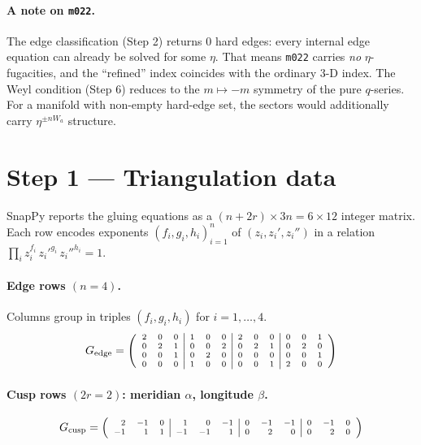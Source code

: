 \documentclass[11pt,a4paper]{article}
\begin{document}
\paragraph{A note on \texttt{m022}.}
The edge classification (Step 2) returns \(0\) hard edges: every
internal edge equation can already be solved for some \(\eta\).  That
means \texttt{m022} carries \emph{no} \(\eta\)-fugacities, and the
``refined'' index coincides with the ordinary \(3\)-D index.  The
Weyl condition (Step 6) reduces to the \(m\mapsto-m\) symmetry of the
pure \(q\)-series.  For a manifold with non-empty hard-edge set, the
sectors would additionally carry \(\eta^{\pm nW_a}\) structure.

\section{Step 1 --- Triangulation data}

SnapPy reports the gluing equations as a \((n+2r)\times 3n = 6\times 12\)
integer matrix.  Each row encodes exponents \((f_i,g_i,h_i)_{i=1}^{n}\)
of \((z_i, z_i', z_i'')\) in a relation
\(\prod_i z_i^{f_i}\, z_i'^{g_i}\, z_i''^{h_i} = 1\).

\paragraph{Edge rows \((n=4)\).}  Columns group in triples
\((f_i, g_i, h_i)\) for \(i=1,\dots,4\).
\[
G_{\text{edge}} = \scriptsize
\left(\begin{array}{rrr|rrr|rrr|rrr}
 2 & 0 & 0 & 1 & 0 & 0 & 2 & 0 & 0 & 0 & 0 & 1 \\
 0 & 2 & 1 & 0 & 0 & 2 & 0 & 2 & 1 & 0 & 2 & 0 \\
 0 & 0 & 1 & 0 & 2 & 0 & 0 & 0 & 0 & 0 & 0 & 1 \\
 0 & 0 & 0 & 1 & 0 & 0 & 0 & 0 & 1 & 2 & 0 & 0 \\
\end{array}\right)
\]

\paragraph{Cusp rows \((2r=2)\): meridian \(\alpha\), longitude \(\beta\).}
\[
G_{\text{cusp}} = \scriptsize
\left(\begin{array}{rrr|rrr|rrr|rrr}
 2 & -1 & 0 & 1 & 0 & -1 & 0 & -1 & -1 & 0 & -1 & 0 \\
-1 &  1 & 1 & -1 & -1 & 1 & 0 & 2 & 0 & 0 & 2 & 0 \\
\end{array}\right)
\]
\end{document}
